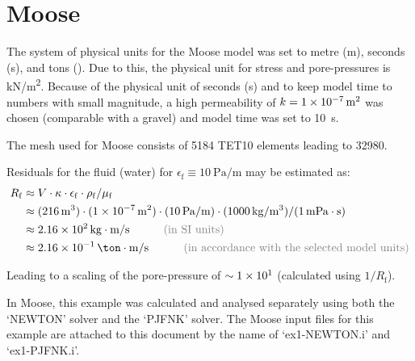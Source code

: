 \section{Moose}

The system of physical units for the Moose model was set to metre
(\unit{\metre}), seconds (\unit{\second}), and tons (\unit{\ton}).
Due to this, the physical unit for stress and pore-pressures is
\unit[per-mode = symbol]{\kilo\newton\per\square\metre}. Because
of the physical unit of seconds (\unit{\second}) and to keep model
time to numbers with small magnitude, a high permeability of
$k = \qty{1E-7}{\square\metre}$ was chosen (comparable with a gravel)
and model time was set to \qty{10}{\second}.

The mesh used for Moose consists of \qty{5184}{} TET10 elements leading to
\qty{32980}{\DOF}.

Residuals for the fluid (water) for $ \epsilon_\mathrm{f} \equiv \qty[per-mode = symbol]{10}{\pascal\per\metre} $ may be estimated as:
\begin{equation}
    \begin{split}
        R_\mathrm{f} & \approx V \cdot \kappa \cdot \epsilon_\mathrm{f} \cdot \rho_\mathrm{f} / \mu_\mathrm{f}                                                                                                                                            \\
                     & \approx (\qty{216}{\cubic\metre}) \cdot (\qty{1E-7}{\square\metre}) \cdot (\qty[per-mode = symbol]{10}{\pascal\per\metre}) \cdot (\qty[per-mode = symbol]{1000}{\kilogram\per\cubic\metre}) / (\qty{1}{\milli\pascal\cdot\second}) \\
                     & \approx \qty{2.16E+2}{\kilogram\cdot\metre\per\second}  \hspace{3.00em} \text{\light{(in SI units)}}                                                                                                                               \\
                     & \approx \qty{2.16E-1}{\ton\cdot\metre\per\second}       \hspace{3.09em} \text{\light{(in accordance with the selected model units)}}
    \end{split}
\end{equation}

Leading to a scaling of the pore-pressure of $\sim \qty{1E+1}{}$
(calculated using $ 1 / R_\mathrm{f} $).

In Moose, this example was calculated and analysed separately using both the
‘NEWTON’ solver and the ‘PJFNK’ solver. The Moose input files for this example
are attached to this document by the name of ‘ex1-NEWTON.i’ and ‘ex1-PJFNK.i’.

